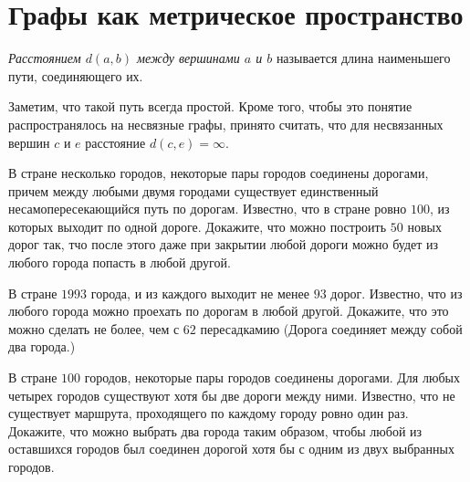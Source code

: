 \section{Графы как метрическое пространство}


\begin{definition}
	\emph{Расстоянием $d(a, b)$ между вершинами $a$ и $b$} называется длина наименьшего пути, соединяющего их.
\end{definition}
	
	Заметим, что такой путь всегда простой. Кроме того, чтобы это понятие распространялось на несвязные графы, принято считать, что для несвязанных вершин $c$ и $e$ расстояние $d(c, e) = \infty$.
	

\begin{exersize}
	В стране несколько городов, некоторые пары городов соединены дорогами, причем между любыми двумя городами существует единственный несамопересекающийся путь по дорогам. Известно, что в стране ровно $100$, из которых выходит по одной дороге. Докажите, что можно построить $50$ новых дорог так, тчо после этого даже при закрытии любой дороги можно будет из любого города попасть в любой другой.
\end{exersize}	 

\begin{exersize}
	В стране $1993$ города, и из каждого выходит не менее $93$ дорог. Известно, что из любого города можно проехать по дорогам в любой другой. Докажите, что это можно сделать не более, чем с $62$ пересадкамию (Дорога соединяет между собой два города.)
\end{exersize}	 

\begin{exersize}
	В стране $100$ городов, некоторые пары городов соединены дорогами. Для любых четырех городов существуют хотя бы две дороги между ними. Известно, что не существует маршрута, проходящего по каждому городу ровно один раз. Докажите, что можно выбрать два города таким образом, чтобы любой из оставшихся городов был соединен дорогой хотя бы с одним из двух выбранных городов.
\end{exersize}	

